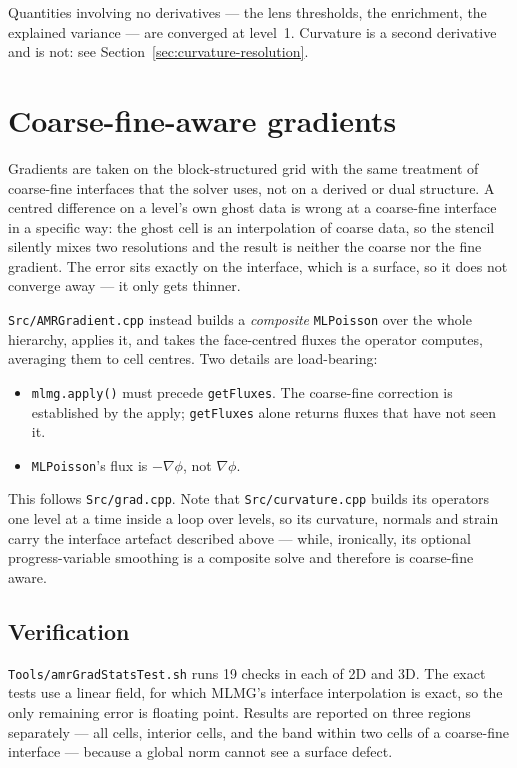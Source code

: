 \documentclass[11pt]{article}
\newcommand{\grad}{\nabla}
\begin{document}
Quantities involving no derivatives --- the lens thresholds, the enrichment,
the explained variance --- are converged at level~1. Curvature is a second
derivative and is not: see Section~\ref{sec:curvature-resolution}.

\section{Coarse-fine-aware gradients}
\label{sec:gradients}

Gradients are taken on the block-structured grid with the same treatment of
coarse-fine interfaces that the solver uses, not on a derived or dual
structure. A centred difference on a level's own ghost data is wrong at a
coarse-fine interface in a specific way: the ghost cell is an interpolation of
coarse data, so the stencil silently mixes two resolutions and the result is
neither the coarse nor the fine gradient. The error sits exactly on the
interface, which is a surface, so it does not converge away --- it only gets
thinner.

\texttt{Src/AMRGradient.cpp} instead builds a \emph{composite}
\texttt{MLPoisson} over the whole hierarchy, applies it, and takes the
face-centred fluxes the operator computes, averaging them to cell centres.
Two details are load-bearing:

\begin{itemize}
\item \texttt{mlmg.apply()} must precede \texttt{getFluxes}. The coarse-fine
      correction is established by the apply; \texttt{getFluxes} alone returns
      fluxes that have not seen it.
\item \texttt{MLPoisson}'s flux is $-\grad\phi$, not $\grad\phi$.
\end{itemize}

This follows \texttt{Src/grad.cpp}. Note that \texttt{Src/curvature.cpp}
builds its operators one level at a time inside a loop over levels, so its
curvature, normals and strain carry the interface artefact described above ---
while, ironically, its optional progress-variable smoothing is a composite
solve and therefore is coarse-fine aware.

\subsection{Verification}

\texttt{Tools/amrGradStatsTest.sh} runs 19 checks in each of 2D and 3D. The
exact tests use a linear field, for which MLMG's interface interpolation is
exact, so the only remaining error is floating point. Results are reported on
three regions separately --- all cells, interior cells, and the band within
two cells of a coarse-fine interface --- because a global norm cannot see a
surface defect.
\end{document}
